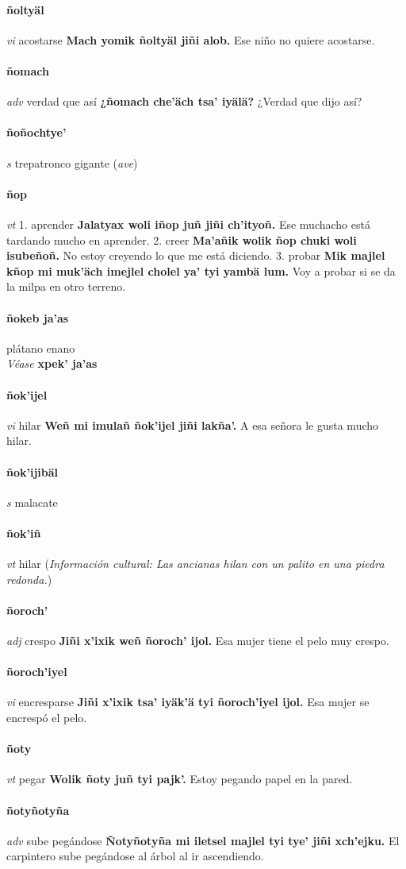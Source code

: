 \documentclass{scrbook}
\newcommand{\entry}[1]{\paragraph{#1}}
\newcommand{\onedefinition}[1]{#1.}
\newcommand{\partofspeech}[1]{\textit{#1}}
\newcommand{\spanishtranslation}[1]{#1}
\newcommand{\clarification}[1]{(\textit{#1})}
\newcommand{\cholexample}[1]{\textbf{#1}}
\newcommand{\exampletranslation}[1]{#1}
\newcommand{\alsosee}[1]{\\\textit{Véase} \textbf{#1}}
\newcommand{\culturalinformation}[1]{(\textit{#1})}
\begin{document}
\begin{multicols}{2}
\entry{ñoltyäl}
\partofspeech{vi}
\spanishtranslation{acostarse}
\cholexample{Mach yomik ñoltyäl jiñi alob.}
\exampletranslation{Ese niño no quiere acostarse.}

\entry{ñomach}
\partofspeech{adv}
\spanishtranslation{verdad que así}
\cholexample{¿ñomach che'äch tsa' iyälä?}
\exampletranslation{¿Verdad que dijo así?}

\entry{ñoñochtye'}
\partofspeech{s}
\spanishtranslation{trepatronco gigante}
\clarification{ave}

\entry{ñop}
\partofspeech{vt}
\onedefinition{1}
\spanishtranslation{aprender}
\cholexample{Jalatyax woli iñop juñ jiñi ch'ityoñ.}
\exampletranslation{Ese muchacho está tardando mucho en aprender.}
\onedefinition{2}
\spanishtranslation{creer}
\cholexample{Ma'añik wolik ñop chuki woli isubeñoñ.}
\exampletranslation{No estoy creyendo lo que me está diciendo.}
\onedefinition{3}
\spanishtranslation{probar}
\cholexample{Mik majlel kñop mi muk'äch imejlel cholel ya' tyi yambä lum.}
\exampletranslation{Voy a probar si se da la milpa en otro terreno.}

\entry{ñokeb ja'as}
\spanishtranslation{plátano enano}
\alsosee{xpek' ja'as}

\entry{ñok'ijel}
\partofspeech{vi}
\spanishtranslation{hilar}
\cholexample{Weñ mi imulañ ñok'ijel jiñi lakña'.}
\exampletranslation{A esa señora le gusta mucho hilar.}

\entry{ñok'ijibäl}
\partofspeech{s}
\spanishtranslation{malacate}

\entry{ñok'iñ}
\partofspeech{vt}
\spanishtranslation{hilar}
\culturalinformation{Información cultural: Las ancianas hilan con un palito en una piedra redonda.}

\entry{ñoroch'}
\partofspeech{adj}
\spanishtranslation{crespo}
\cholexample{Jiñi x'ixik weñ ñoroch' ijol.}
\exampletranslation{Esa mujer tiene el pelo muy crespo.}

\entry{ñoroch'iyel}
\partofspeech{vi}
\spanishtranslation{encresparse}
\cholexample{Jiñi x'ixik tsa' iyäk'ä tyi ñoroch'iyel ijol.}
\exampletranslation{Esa mujer se encrespó el pelo.}

\entry{ñoty}
\partofspeech{vt}
\spanishtranslation{pegar}
\cholexample{Wolik ñoty juñ tyi pajk'.}
\exampletranslation{Estoy pegando papel en la pared.}

\entry{ñotyñotyña}
\partofspeech{adv}
\spanishtranslation{sube pegándose}
\cholexample{Ñotyñotyña mi iletsel majlel tyi tye' jiñi xch'ejku.}
\exampletranslation{El carpintero sube pegándose al árbol al ir ascendiendo.}


\end{multicols}
\end{document}
